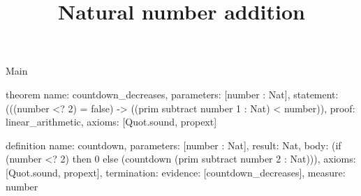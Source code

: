 \begin{lexlean}{Main}
\title{Natural number addition}
\begin{semanticmodule}
theorem{
  name: countdown_decreases,
  parameters: [number : Nat],
  statement: (((number <? 2) = false) -> ((prim subtract number 1 : Nat) < number)),
  proof: linear_arithmetic{},
  axioms: [Quot.sound, propext]
}

definition{
  name: countdown,
  parameters: [number : Nat],
  result: Nat,
  body: (if (number <? 2) then 0 else (countdown (prim subtract number 2 : Nat))),
  axioms: [Quot.sound, propext],
  termination: {evidence: [countdown_decreases], measure: number}
}
\end{semanticmodule}
\end{lexlean}
